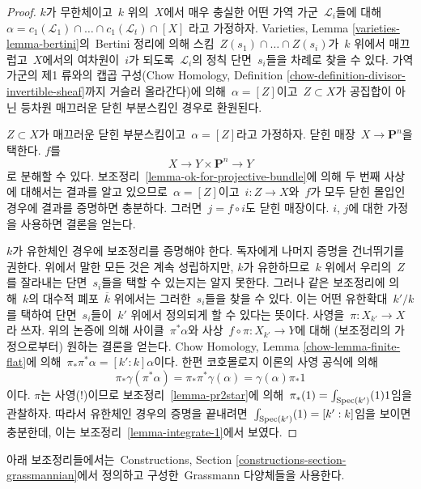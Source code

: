 \begin{proof}
\medskip\noindent
$k$가 무한체이고\  $k$ 위의\  $X$에서 매우 충실한 어떤 가역 가군\ 
$\mathcal{L}_i$들에 대해\ 
$\alpha = 
c_1(\mathcal{L}_1) \cap \ldots \cap c_1(\mathcal{L}_t) \cap [X]$
라고 가정하자. Varieties, Lemma \ref{varieties-lemma-bertini}의\ 
Bertini 정리에 의해 스킴\  $Z(s_1) \cap \ldots \cap Z(s_i)$가\ 
$k$ 위에서 매끄럽고\  $X$에서의 여차원이\  $i$가 되도록\ 
$\mathcal{L}_i$의 정칙 단면\  $s_i$들을 차례로 찾을 수 있다.
가역 가군의 제1 류와의 캡곱 구성(Chow Homology, Definition
\ref{chow-definition-divisor-invertible-sheaf}까지 거슬러 올라간다)에
의해\  $\alpha = [Z]$이고\  $Z \subset X$가 공집합이 아닌 등차원
매끄러운 닫힌 부분스킴인 경우로 환원된다.

\medskip\noindent
$Z \subset X$가 매끄러운 닫힌 부분스킴이고\  $\alpha = [Z]$라고
가정하자. 닫힌 매장\  $X \to \mathbf{P}^n$을 택한다. $f$를
$$
X \to Y \times \mathbf{P}^n \to Y
$$
로 분해할 수 있다. 보조정리\  \ref{lemma-ok-for-projective-bundle}에
의해 두 번째 사상에 대해서는 결과를 알고 있으므로\ 
$\alpha = [Z]$이고\  $i : Z \to X$와\  $f$가 모두 닫힌 몰입인
경우에 결과를 증명하면 충분하다. 그러면\  $j = f \circ i$도 닫힌
매장이다. $i$, $j$에 대한 가정을 사용하면 결론을 얻는다.

\medskip\noindent
$k$가 유한체인 경우에 보조정리를 증명해야 한다. 독자에게 나머지
증명을 건너뛰기를 권한다. 위에서 말한 모든 것은 계속 성립하지만,
$k$가 유한하므로\  $k$ 위에서 우리의\  $Z$를 잘라내는 단면\  $s_i$들을
택할 수 있는지는 알지 못한다. 그러나 같은 보조정리에 의해\  $k$의
대수적 폐포\  $\overline{k}$ 위에서는 그러한\  $s_i$들을 찾을 수 있다.
이는 어떤 유한확대\  $k'/k$를 택하여 단면\  $s_i$들이\  $k'$ 위에서
정의되게 할 수 있다는 뜻이다. 사영을\  $\pi : X_{k'} \to X$라 쓰자.
위의 논증에 의해
사이클\  $\pi^*\alpha$와 사상\  $f \circ \pi : X_{k'} \to Y$에 대해
(보조정리의 가정으로부터) 원하는 결론을 얻는다. Chow Homology,
Lemma \ref{chow-lemma-finite-flat}에 의해\ 
$\pi_*\pi^*\alpha = [k' : k] \alpha$이다. 한편 코호몰로지 이론의
사영 공식에 의해
$$
\pi_*\gamma(\pi^*\alpha) = \pi_*\pi^*\gamma(\alpha) =
\gamma(\alpha) \pi_*1
$$
이다. $\pi$는 사영(!)이므로 보조정리\  \ref{lemma-pr2star}에 의해\ 
$\pi_*(1) = \int_{\mathop{\mathrm{Spec}}(k')}(1) 1$임을 관찰하자. 따라서 유한체인
경우의 증명을 끝내려면\ 
$\int_{\mathop{\mathrm{Spec}}(k')}(1) = [k' : k]$임을 보이면 충분한데, 이는 보조정리\ 
\ref{lemma-integrate-1}에서 보였다.
\end{proof}

\noindent
아래 보조정리들에서는\  Constructions, Section
\ref{constructions-section-grassmannian}에서 정의하고 구성한\ 
Grassmann 다양체들을 사용한다.

